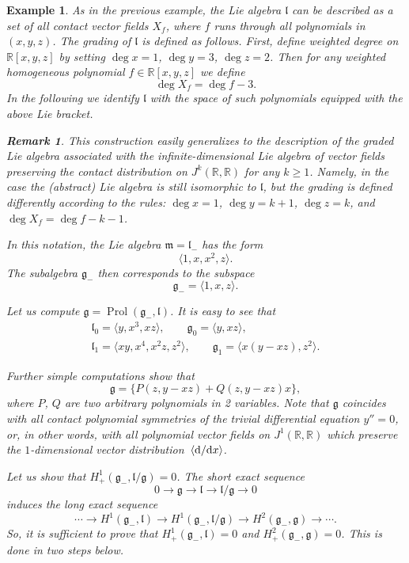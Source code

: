 \documentclass[10pt,a4paper]{amsart}
\newcommand{\R}{\mathbb R}
\newcommand{\g}{\mathfrak g}
\newcommand{\lf}{\mathfrak l}
\newcommand{\m}{\mathfrak m}
\newcommand{\Prol}{\operatorname{Prol}}
\newtheorem{ex}[thm]{Example}
\newtheorem{rem}[thm]{Remark}}
\numberwithin{equation}{section}
\begin{document}
\begin{ex}
	As in the previous example, the Lie algebra $\lf$ can be described as a set of all contact vector fields $X_f$, where $f$ runs through all polynomials in $(x,y,z)$. The grading of $\lf$ is defined as follows. First, define weighted degree on $\R[x,y,z]$ by setting $\deg x = 1$, $\deg y = 3$, $\deg z = 2$. Then for any weighted homogeneous polynomial $f\in\R[x,y,z]$ we define
	\[
	\deg X_f = \deg f - 3.
	\]
	In the following we identify $\lf$ with the space of such polynomials equipped with the above Lie bracket.
	\begin{rem}
		This construction easily generalizes to the description of the graded Lie algebra associated with the infinite-dimensional Lie algebra of vector fields preserving the contact distribution on $J^k(\R,\R)$ for any $k\ge 1$. Namely, in the case the (abstract) Lie algebra is still isomorphic to $\lf$, but the grading is defined differently according to the rules: $\deg x = 1$, $\deg y = k+1$, $\deg z = k$, and $\deg X_f =\deg f-k-1$.
	\end{rem}
	
	In this notation, the Lie algebra $\m=\lf_{-}$ has the form
	\[
	\langle 1, x, x^2, z\rangle.
	\]
	The subalgebra $\g_{-}$ then corresponds to the subspace
	\[
	\g_{-} = \langle 1, x, z \rangle.
	\]
	
	Let us compute $\g=\Prol(\g_{-}, \lf)$. It is easy to see that
	\begin{gather*}
	\lf_0 = \big\langle y, x^3, xz \big\rangle,\qquad
	\g_0 = \langle y, xz \rangle,\\
	\lf_1 = \big\langle xy, x^4, x^2z, z^2\big\rangle,\qquad
	\g_1 = \big\langle x(y-xz), z^2 \big\rangle.
	\end{gather*}
	
	Further simple computations show that
	\[
	\g = \{ P(z,y-xz)+Q(z,y-xz)x \},
	\]
	where $P$, $Q$ are two arbitrary polynomials in 2 variables. Note that $\g$ coincides with all contact polynomial symmetries of the trivial differential equation $y''=0$, or, in other words, with all polynomial vector fields on $J^1(\R,\R)$ which preserve the $1$-dimensional vector distribu\-tion~$\langle {\rm d}/{\rm d}x \rangle$.
	
	{\samepage
Let us show that $H^1_+(\g_{-},\lf/\g)=0$. The short exact sequence
	\[
	0\to \g \to \lf \to \lf/\g \to 0
	\]
	induces the long exact sequence
	\begin{equation}\label{lex}
	\cdots \to H^1(\g_{-}, \lf) \to H^1(\g_{-}, \lf/\g) \to H^2(\g_{-},\g) \to \cdots.
	\end{equation}
	So, it is sufficient to prove that $H^1_{+}(\g_{-}, \lf) = 0$ and $H^2_{+}(\g_{-},\g)=0$. This is done in two steps below.

}
\end{ex}
\end{document}
